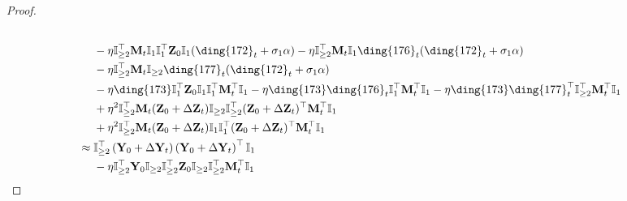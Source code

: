 \documentclass{article}
\theoremstyle{plain}
\theoremstyle{remark}
\def\bY{\mathbf{Y}}
\def\bZ{\mathbf{Z}}
\newcommand{\cc}[1]{\text{\ding{\number\numexpr#1 + 171\relax}}}
\begin{document}
\begin{proof}
\begin{align*}
        \\
        &~~~~
            -\eta\mathbb{I}_{\ge2}^\top\mathbf{M}_t\mathbb{I}_{1}\mathbb{I}_{1}^\top\bZ_0\mathbb{I}_{1}(\cc{1}_t+\sigma_1\alpha) 
            -\eta\mathbb{I}_{\ge2}^\top\mathbf{M}_t\mathbb{I}_{1}\cc{5}_t(\cc{1}_t+\sigma_1\alpha) 
            \\&~~~~
            -\eta\mathbb{I}_{\ge2}^\top\mathbf{M}_t\mathbb{I}_{\ge2}\cc{6}_t(\cc{1}_t+\sigma_1\alpha) 
        \\
        &~~~~
            -\eta\cc{2}\mathbb{I}_{1}^\top\bZ_0\mathbb{I}_{1}\mathbb{I}_{1}^\top\mathbf{M}_t^\top\mathbb{I}_{1}
            -\eta\cc{2}\cc{5}_t\mathbb{I}_{1}^\top\mathbf{M}_t^\top\mathbb{I}_{1}
            -\eta\cc{2}\cc{6}_t^\top\mathbb{I}_{\ge2}^\top\mathbf{M}_t^\top\mathbb{I}_{1}
        \\
        &~~~~
            +\eta^2\mathbb{I}_{\ge2}^\top\mathbf{M}_t(\bZ_0+\Delta\bZ_t)\mathbb{I}_{\ge2}\mathbb{I}_{\ge2}^\top(\bZ_0+\Delta\bZ_t)^\top\mathbf{M}_t^\top\mathbb{I}_{1}
        \\
        &~~~~
            +\eta^2\mathbb{I}_{\ge2}^\top\mathbf{M}_t(\bZ_0+\Delta\bZ_t)\mathbb{I}_{1}\mathbb{I}_{1}^\top(\bZ_0+\Delta\bZ_t)^\top\mathbf{M}_t^\top\mathbb{I}_{1}
        \\
        &\approx 
        \mathbb{I}_{\ge2}^\top\left(\bY_0+\Delta\bY_t\right)\left(\bY_0+\Delta\bY_t\right)^\top\mathbb{I}_{1}
        \\
        &~~~~
            -\eta\mathbb{I}_{\ge2}^\top\bY_0\mathbb{I}_{\ge2}\mathbb{I}_{\ge2}^\top\bZ_0\mathbb{I}_{\ge2}\mathbb{I}_{\ge2}^\top\mathbf{M}_t^\top\mathbb{I}_{1}

\end{align*}
\end{proof}
\end{document}
